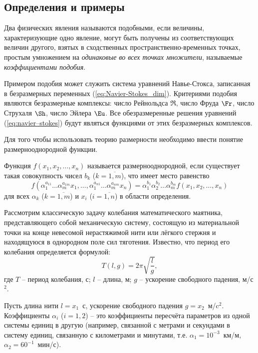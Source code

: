 \documentclass[a4paper, 14pt]{extarticle}
\begin{document}
\subsection{Определения и примеры}

\begin{dfn}
	Два физических явления называются \alert{подобными}, если величины, характеризующие одно явление, могут быть получены из соответствующих величин другого, взятых в сходственных пространственно-вре\-мен\-ных точках, простым умножением на \textit{одинаковые во всех точках множители}, называемые \textit{коэффициентами подобия}.
\end{dfn}

Примером подобия может служить система уравнений Навье-Стокса, записанная в безразмерных переменных (\ref{eq:Navier-Stokes_dim}). Критериями подобия являются безразмерные комплексы: число Рейнольдса $\Re$, число Фруда $\Fr$, число Струхаля $\Sh$, число Эйлера $\Eu$. Все обезразмеренные решения уравнений (\ref{eq:navier–stokes}) будут являться функциями от этих безразмерных комплексов.

Для того чтобы использовать теорию размерности необходимо ввести понятие \alert{размернооднородной} функции. 

\begin{dfn}
	Функция $f(x_1, x_2, \ldots, x_n)$ называется \alert{размернооднородной}, если существует такая совокупность чисел $b_k$ ($k=\overline{1,m}$), что имеет место равенство
	\begin{equation}
	\label{eq:dimension_uniform_function_dfn}
	f(\alpha_1^{a_{11}}\ldots \alpha_m^{a_{1m}}x_1,\ldots,
	\alpha_1^{a_{n1}}\ldots \alpha_m^{a_{nm}}x_n) = 
	\alpha_1^{b_1}\alpha_2^{b_2}\ldots \alpha_m^{b_m} f(x_1, x_2, \ldots, x_n)
	\end{equation}
	для всех $\alpha_k$ ($k=\overline{1,m}$) и $x_i$ ($i=\overline{1,n}$) в области определения.
\end{dfn}

Рассмотрим классическую задачу колебания математического маятника, представляющего собой механическую систему, состоящую из материальной точки на конце невесомой нерастяжимой нити или лёгкого стержня и находящуюся в однородном поле сил тяготения. Известно, что период его колебания определяется формулой:
\[
T(l, g) = 2 \pi \sqrt{\frac{l}{g}},
\]
где $T$ -- период колебания, с; $l$ -- длина, м; $g$ -- ускорение свободного падения, м/с$^2$.

Пусть длина нити $l = x_1$~с, ускорение свободного падения $g = x_2$~м/c$^2$. Коэффициенты $\alpha_i$ ($i=1,2$) -- это коэффициенты пересчёта параметров из одной системы единиц в другую (например, связанной с метрами и секундами в систему единиц, связанную с километрами и минутами, т.е. $\alpha_1 = 10^{-3}$~км/м, $\alpha_2 = 60^{-1}$~мин/с).
\end{document}
